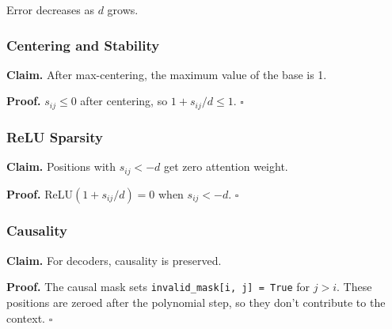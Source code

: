Error decreases as $d$ grows.

\subsubsection{Centering and Stability}

\textbf{Claim.} After max-centering, the maximum value of the base is 1.

\textbf{Proof.} $s_{ij} \leq 0$ after centering, so $1 + s_{ij}/d \leq 1$. $\square$

\subsubsection{ReLU Sparsity}

\textbf{Claim.} Positions with $s_{ij} < -d$ get zero attention weight.

\textbf{Proof.} ReLU$(1 + s_{ij}/d) = 0$ when $s_{ij} < -d$. $\square$

\subsubsection{Causality}

\textbf{Claim.} For decoders, causality is preserved.

\textbf{Proof.} The causal mask sets \texttt{invalid\_mask[i, j] = True} for $j > i$. 
These positions are zeroed after the polynomial step, so they don't 
contribute to the context. $\square$

